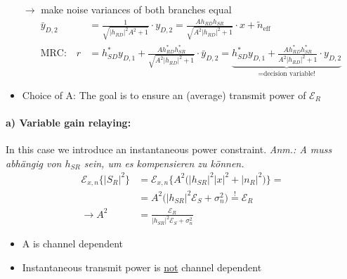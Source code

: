 \documentclass[a4paper, 10pt]{article}
\begin{document}
\begin{itemize}
	\item[$\rightarrow$] make noise variances of both branches equal
	\begin{align*}
		\bar{y}_{D,2} &= \frac{1}{\sqrt{|h_{RD}|^2A^2+1}}\cdot y_{D,2} = \frac{Ah_{RD}h_{SR}}{\sqrt{A^2|h_{RD}|^2 + 1}} \cdot x + \tilde{n}_{\text{eff}} \\
		\text{MRC:}\quad r &= h_{SD}^*y_{D,1} + \frac{Ah_{RD}^*h_{SR}^*}{\sqrt{A^2|h_{RD}|^2+1}}\cdot\bar{y}_{D,2} = \underbrace{h_{SD}^*y_{D,1} + \frac{Ah_{RD}^*h_{SR}^*}{A^2|h_{RD}|^2 + 1}\cdot y_{D,2}}_{ = \text{decision variable!}}		
	\end{align*}
	\item Choice of A: The goal is to ensure an (average) transmit power of $\mathcal{E}_R $	
\end{itemize}
\paragraph{a) Variable gain relaying:}
In this case we introduce an instantaneous power constraint. \textit{Anm.: A muss abh\"angig von $h_{SR} $ sein, um es kompensieren zu k\"onnen.}
\begin{align*}
	\mathcal{E}_{x,n}\bigl\{|S_R|^2\bigr\} &= \mathcal{E}_{x,n}\bigl\{A^2\bigl(|h_{SR}|^2|x|^2 + |n_R|^2\bigr)\bigr\} = \\ &= A^2\bigl(|h_{SR}|^2\mathcal{E}_S + \sigma_n^2\bigr) \overset{!}{=} \mathcal{E}_R \\ \rightarrow A^2 &= \frac{\mathcal{E}_R}{|h_{SR}|^2\mathcal{E}_S + \sigma_n^2}	 
\end{align*}
\begin{itemize}
	\item A is channel dependent
	\item Instantaneous transmit power is \underline{not} channel dependent 
\end{itemize}
\end{document}

